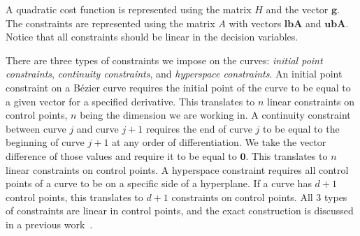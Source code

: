 \documentclass{svproc}
\newcommand{\vg}{\mathbf{g}}
\newcommand{\vzero}{\mathbf{0}}
\newcommand{\vn}{\mathbf{n}}
\newcommand{\vlbA}{\mathbf{lbA}}
\newcommand{\vubA}{\mathbf{ubA}}
\begin{document}
A quadratic cost function is represented using the matrix $H$ and the vector $\vg$. The constraints are represented using the matrix $A$ with vectors $\vlbA$ and $\vubA$.
Notice that all constraints should be linear in the decision variables.

There are three types of constraints we impose on the curves: \emph{initial point constraints}, \emph{continuity constraints}, and \emph{hyperspace constraints}.
An initial point constraint on a B\'ezier curve requires the initial point of the curve to be equal to a given vector for a specified derivative. This translates to $n$ linear constraints on control points, $n$ being the dimension we are working in.
A continuity constraint between curve $j$ and curve $j+1$ requires the end of curve $j$ to be equal to the beginning of curve $j+1$ at any order of differentiation.
We take the vector difference of those values and require it to be equal to $\vzero$. This translates to $n$ linear constraints on control points.
A hyperspace constraint requires all control points of a curve to be on a specific side of a hyperplane. If a curve has $d+1$ control points, this translates to $d+1$ constraints on control points. All 3 types of constraints are linear in control points, and the exact construction is discussed in a previous work~\cite{crazyplanning-ieeetro}.




\end{document}
